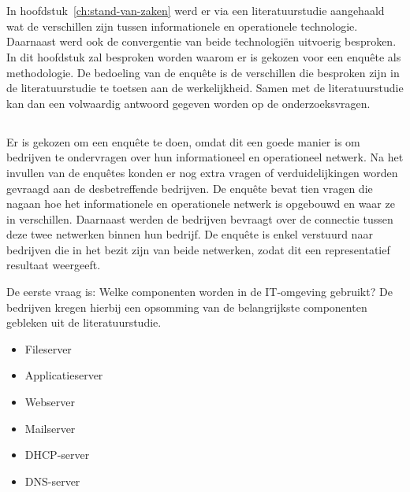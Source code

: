 
\chapter{}
\label{ch:methodologie}
In hoofdstuk~\ref{ch:stand-van-zaken} werd er via een literatuurstudie aangehaald wat de verschillen zijn tussen informationele en operationele technologie. Daarnaast werd ook de convergentie van beide technologiën uitvoerig besproken. In dit hoofdstuk zal besproken worden waarom er is gekozen voor een enquête als methodologie. De bedoeling van de enquête is de verschillen die besproken zijn in de literatuurstudie te toetsen aan de werkelijkheid. Samen met de literatuurstudie kan dan een volwaardig antwoord gegeven worden op de onderzoeksvragen.

\section{}
\label{sec:Enquête}
Er is gekozen om een enquête te doen, omdat dit een goede manier is om bedrijven te ondervragen over hun informationeel en operationeel netwerk. Na het invullen van de enquêtes konden er nog extra vragen of verduidelijkingen worden gevraagd aan de desbetreffende bedrijven. De enquête bevat tien vragen die nagaan hoe het informationele en operationele netwerk is opgebouwd en waar ze in verschillen. Daarnaast werden de bedrijven bevraagt over de connectie tussen deze twee netwerken binnen hun bedrijf. De enquête is enkel verstuurd naar bedrijven die in het bezit zijn van beide netwerken, zodat dit een representatief resultaat weergeeft. 

De eerste vraag is: Welke componenten worden in de IT-omgeving gebruikt? De bedrijven kregen hierbij een opsomming van de belangrijkste componenten gebleken uit de literatuurstudie. 
\begin{itemize}
    \item Fileserver
    \item Applicatieserver
    \item Webserver
    \item Mailserver
    \item DHCP-server
    \item DNS-server
\end{itemize}

